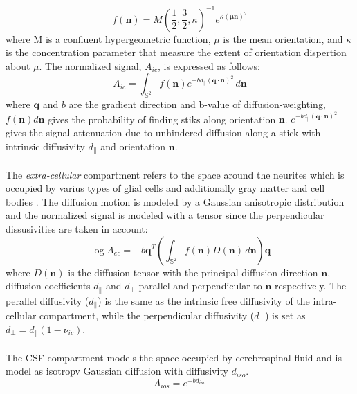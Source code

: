  \begin{equation}
   f(\mathbf{n}) = M(\frac{1}{2},\frac{3}{2},\kappa)^{-1}e^{\kappa(\mathbf{ \mu n})^2}
 \end{equation}
 where M is a confluent hypergeometric function, $\mu$ is the mean orientation, and $\kappa$ is the concentration parameter that measure the extent of orientation dispertion about $\mu$.
 The normalized signal, $A_{ic}$, is expressed as follows:
 \begin{equation}
   A_{ic} = \int_{\mathbb{S}^2} f(\mathbf{n})e^{-bd_{\parallel}(\mathbf{q\cdot n})^2} \,d\mathbf{n}
 \end{equation}
 where $\mathbf{q}$ and $b$ are the gradient direction and b-value of diffusion-weighting, $f(\mathbf{n})d\mathbf{n}$ gives the probability of finding stiks along orientation $\mathbf{n}$. $e^{-bd_{\parallel}(\mathbf{q\cdot n})^2}$ gives the signal attenuation due to unhindered diffusion along a stick with intrinsic diffusivity $d_{\parallel}$ and orientation $\mathbf{n}$.
 \\\\
 The \emph{extra-cellular} compartment refers to the space around the neurites which is occupied by varius types of glial cells and additionally gray matter and cell bodies \cite{zhang2012noddi}. The diffusion motion is modeled by a Gaussian anisotropic distribution and the normalized signal is modeled with a tensor since the perpendicular dissusivities are taken in account:
 \begin{equation}
   \log A_{ec} = -b\mathbf{q}^T(\int_{\mathbb{S}^2} f(\mathbf{n})D(\mathbf{n})\,d\mathbf{n})\mathbf{q}
 \end{equation}
 where $D(\mathbf{n})$ is the diffusion tensor with the principal diffusion direction $\mathbf{n}$, diffusion coefficients $d_{\parallel}$ and $d_{\perp}$ parallel and perpendicular to $\mathbf{n}$ respectively. The perallel diffusivity ($d_{\parallel}$) is the same as the intrinsic free diffusivity of the intra-cellular compartment, while the perpendicular diffusivity ($d_{\perp}$) is set as $d_{\perp} = d_{\parallel}(1-\nu_{ic})$.
 \\\\
 The CSF compartment models the space occupied by cerebrospinal fluid and is model as isotropv Gaussian diffusion with diffusivity $d_{iso}$.
 \begin{equation}
   A_{ios} = e^{-b d_{iso}}
 \end{equation}
